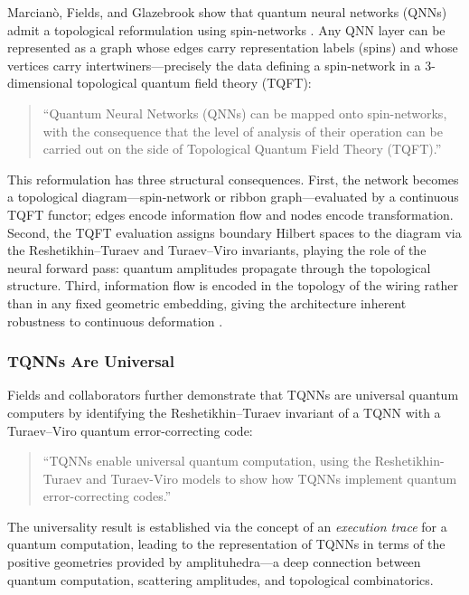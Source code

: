 \documentclass[
]{article}
\begin{document}
Marcianò, Fields, and Glazebrook show that quantum neural networks
(QNNs) admit a topological reformulation using spin-networks
\citep{fields2022tqnn}. Any QNN layer can be represented as a graph
whose edges carry representation labels (spins) and whose vertices carry
intertwiners---precisely the data defining a spin-network in a
3-dimensional topological quantum field theory (TQFT):

\begin{quote}
``Quantum Neural Networks (QNNs) can be mapped onto spin-networks, with
the consequence that the level of analysis of their operation can be
carried out on the side of Topological Quantum Field Theory (TQFT).''
\citep{fields2022tqnn}
\end{quote}

This reformulation has three structural consequences. First, the network
becomes a topological diagram---spin-network or ribbon graph---evaluated
by a continuous TQFT functor; edges encode information flow and nodes
encode transformation. Second, the TQFT evaluation assigns boundary
Hilbert spaces to the diagram via the Reshetikhin--Turaev and
Turaev--Viro invariants, playing the role of the neural forward pass:
quantum amplitudes propagate through the topological structure. Third,
information flow is encoded in the topology of the wiring rather than in
any fixed geometric embedding, giving the architecture inherent
robustness to continuous deformation \citep{fields2023tensor}.

\subsubsection{TQNNs Are Universal}\label{tqnns-are-universal}

Fields and collaborators further demonstrate that TQNNs are universal
quantum computers by identifying the Reshetikhin--Turaev invariant of a
TQNN with a Turaev--Viro quantum error-correcting code:

\begin{quote}
``TQNNs enable universal quantum computation, using the
Reshetikhin-Turaev and Turaev-Viro models to show how TQNNs implement
quantum error-correcting codes.'' \citep{fields2025amplituhedra}
\end{quote}

The universality result is established via the concept of an
\emph{execution trace} for a quantum computation, leading to the
representation of TQNNs in terms of the positive geometries provided by
amplituhedra---a deep connection between quantum computation, scattering
amplitudes, and topological combinatorics.
\end{document}
